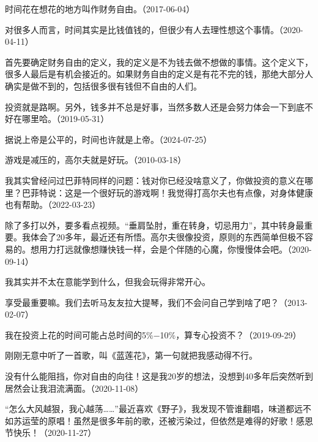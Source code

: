 
时间花在想花的地方叫作财务自由。（2017-06-04）

对很多人而言，时间其实是比钱值钱的，但很少有人去理性想这个事情。（2020-04-11）


首先要确定财务自由的定义，我的定义是不为钱去做不想做的事情。这个定义下，很多人最后是有机会接近的。如果财务自由的定义是有花不完的钱，那绝大部分人确实是做不到的，包括很多很有钱但不自由的人们。

投资就是路啊。另外，钱多并不总是好事，当然多数人还是会努力体会一下到底不好在哪里哈。（2019-05-31）


据说上帝是公平的，时间也许就是上帝。（2024-07-25）


游戏是减压的，高尔夫就是好玩。（2010-03-18）

我其实曾经问过巴菲特同样的问题：钱对你已经没啥意义了，你做投资的意义在哪里？巴菲特说：这是一个很好玩的游戏啊！我觉得打高尔夫也有点像，对身体健康也有帮助。（2022-03-23）


除了多打以外，要多看点视频。“垂肩坠肘，重在转身，切忌用力”，其中转身最重要。我体会了20多年，最近还有所悟。高尔夫很像投资，原则的东西简单但极不容易的。想用力打远就像想赚快钱一样，会是个伴随的心魔，你慢慢体会吧。（2020-09-14）


我其实并不太在意能学到什么，但我会玩得非常开心。

享受最重要嘛。我们去听马友友拉大提琴，我们不会问自己学到啥了吧？（2013-02-07）


我在投资上花的时间可能占总时间的5\%\( - \)10\%，算专心投资不？（2019-09-29）

刚刚无意中听了一首歌，叫《蓝莲花》，第一句就把我感动得不行。

没有什么能阻挡，你对自由的向往！这是我20岁的想法，没想到40多年后突然听到居然会让我泪流满面。（2020-11-08）

“怎么大风越狠，我心越荡……”最近喜欢《野子》，我发现不管谁翻唱，味道都远不如苏运莹的原唱！虽然是很多年前的歌，还被污染过，但依然是难得的好歌！感恩节快乐！（2020-11-27）

